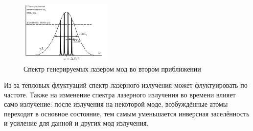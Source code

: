 \begin{figure}[H]
	\centering
	\includegraphics[width=0.4\textwidth]{../Изображения/Спектр2.png}
	\caption{Спектр генерируемых лазером мод во втором приближении}
\end{figure}

Из-за тепловых флуктуаций спектр лазерного излучения может флуктуировать по частоте. Также на изменение спектра лазерного излучения во времени влияет само излучение: после излучения на некоторой моде, возбуждённые атомы переходят в основное состояние, тем самым уменьшается инверсная заселённость и усиление для данной и других мод излучения.


